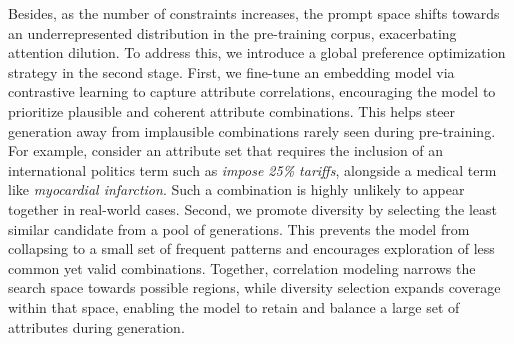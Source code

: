 Besides, as the number of constraints increases, the prompt space shifts towards an underrepresented distribution in the pre-training corpus, exacerbating attention dilution.
To address this, we introduce a global preference optimization strategy in the second stage.
First, we fine-tune an embedding model via contrastive learning to capture attribute correlations, encouraging the model to prioritize plausible and coherent attribute combinations. This helps steer generation away from implausible combinations rarely seen during pre-training. For example, consider an attribute set that requires the inclusion of an international politics term such as \textit{impose 25\% tariffs}, alongside a medical term like \textit{myocardial infarction}. Such a combination is highly unlikely to appear together in real-world cases.
Second, we promote diversity by selecting the least similar candidate from a pool of generations. This prevents the model from collapsing to a small set of frequent patterns and encourages exploration of less common yet valid combinations.
Together, correlation modeling narrows the search space towards possible regions, while diversity selection expands coverage within that space, enabling the model to retain and balance a large set of attributes during generation.

